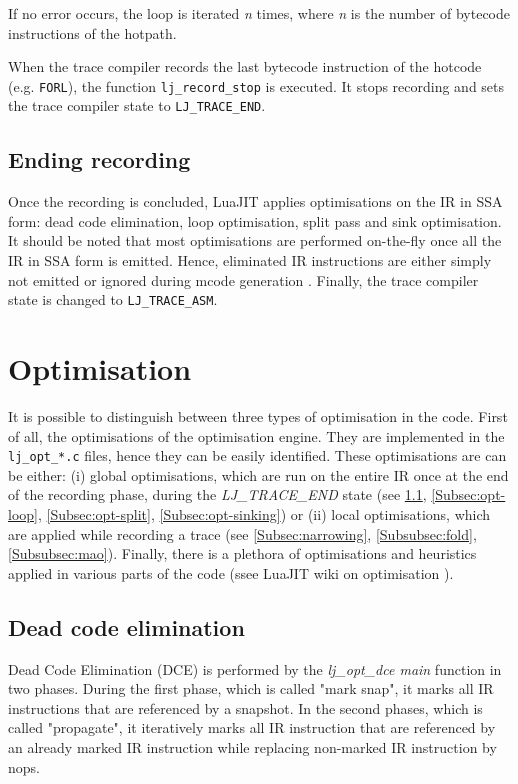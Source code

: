 \noindent
If no error occurs, the loop is iterated \textit{n} times, where \textit{n} is the number of bytecode instructions of the hotpath.

When the trace compiler records the last bytecode instruction of the hotcode (e.g. \texttt{FORL}), the function \texttt{lj\_record\_stop} is executed. It stops recording and sets the trace compiler state to \texttt{LJ\_TRACE\_END}.

\subsection{Ending recording}
Once the recording is concluded, LuaJIT applies optimisations on the IR in SSA form: dead code elimination, loop optimisation, split pass and sink optimisation. It should be noted that most optimisations are performed on-the-fly once all the IR in SSA form is emitted. Hence, eliminated IR instructions are either simply not emitted or ignored during mcode generation \cite{luajit-wiki}. Finally, the trace compiler state is changed to \texttt{LJ\_TRACE\_ASM}.

\section{Optimisation}

It is possible to distinguish between three types of optimisation in the code.
First of all, the optimisations of the optimisation engine.
They are implemented in the \texttt{lj\_opt\_*.c} files, hence they can be easily identified.
These optimisations are can be either: (i) global optimisations, which are run on the
entire IR once at the end of the recording phase, during the
\emph{LJ\_TRACE\_END} state (see \ref{Subsec:opt-dce}, \ref{Subsec:opt-loop},
\ref{Subsec:opt-split}, \ref{Subsec:opt-sinking}) or (ii) local optimisations,
which are applied while recording a trace (see \ref{Subsec:narrowing},
\ref{Subsubsec:fold}, \ref{Subsubsec:mao}). Finally, there is a plethora of
optimisations and heuristics applied in various parts of the code (ssee LuaJIT wiki on
optimisation \cite{luajit-opt}).

\subsection{Dead code elimination}
\label{Subsec:opt-dce}

Dead Code Elimination (DCE) is performed by the \textit{lj\_opt\_dce main} function
in two phases. During the first phase, which is called "mark snap", it marks all IR
instructions that are referenced by a snapshot. In the second phases, which is called
"propagate", it iteratively marks all IR instruction that are referenced by an already
marked IR instruction while replacing non-marked IR instruction by nops.


